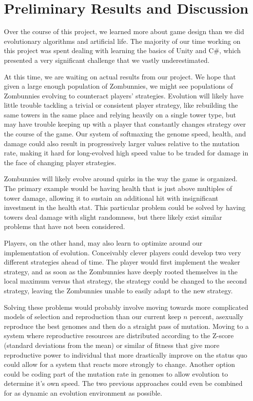 \documentclass[letterpaper]{article}
\begin{document}
\section{Preliminary Results and Discussion}
Over the course of this project, we learned more about game design than we did
evolutionary algorithms and artificial life. The majority of our time working on
this project was spent dealing with learning the basics of Unity and C\#, which
presented a very significant challenge that we vastly underestimated.

At this time, we are waiting on actual results from our project.
We hope that given a large enough population of Zombunnies, we might see
populations of Zombunnies evolving to counteract players' strategies. Evolution
will likely have little trouble tackling a trivial or consistent player
strategy, like rebuilding the same towers in the same place and
relying heavily on a single tower type, but may have trouble keeping
up with a player that constantly changes strategy over the course of the game.
Our system of softmaxing the genome speed, health, and damage could also
result in progressively larger values relative to the mutation rate, making it
hard for long-evolved high speed value to be traded for damage in the face of
changing player strategies.

Zombunnies will likely evolve around quirks in the way the
game is organized. The primary example would be having health that is just above
multiples of tower damage, allowing it to sustain an additional hit with
insignificant investment in the health stat. This particular problem could be
solved by having towers deal damage with slight randomness, but there likely
exist similar problems that have not been considered.

Players, on the other hand, may also learn to optimize around our implementation
of evolution. Conceivably clever players could develop two very different
strategies ahead of time. The player would first implement the weaker strategy,
and as soon as the Zombunnies have deeply rooted themselves in the local maximum
versus that strategy, the strategy could be changed to the second strategy,
leaving the Zombunnies unable to easily adapt to the new strategy.

Solving these problems would probably involve moving towards more complicated
models of selection and reproduction than our current keep \(n\) percent,
asexually reproduce the best genomes and then do a straight pass of mutation.
Moving to a system where reproductive resources are distributed according to the
Z-score (standard deviations from the mean) or similar of fitness that give more
reproductive power to individual that more drastically improve on the status quo
could allow for a system that reacts more strongly to change. Another option
could be coding part of the mutation rate in genomes to allow evolution to
determine it's own speed. The two previous approaches could even be combined for
as dynamic an evolution environment as possible.
\end{document}
